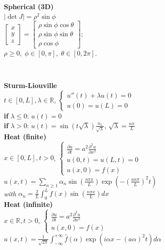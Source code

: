 \documentclass[8pt]{article}
\begin{document}
\begin{minipage}[t]{0.37\textwidth}
	\centering
	\textbf{Spherical (3D)} \\[4pt]
	\(|\det J| = \rho^2\sin\phi\) \\[4pt]
	\(\displaystyle
	\begin{bmatrix}
		x \\[4pt]
		y \\[4pt]
		z
	\end{bmatrix}
	=
	\begin{bmatrix}
		\rho\sin\phi\cos\theta \\[4pt]
		\rho\sin\phi\sin\theta \\[4pt]
		\rho\cos\phi
	\end{bmatrix};
	\) \\[4pt]
	\( \rho \geq 0, \; \phi \in [0, \pi], \; \theta \in [0, 2\pi] \).
\end{minipage}\\[10px]
\begin{minipage}[t]{0.5\textwidth}
	\textbf{Sturm-Liouville}\\
	$t \in [0, L], \lambda \in \mathbb{R}$,
	$\begin{cases}
			u''(t) + \lambda u(t) = 0 \\
			u(0) = u(L) = 0
		\end{cases}$\\
	\textbf{if} $\lambda \leq 0$: $u(t) = 0$\\
	\textbf{if} $\lambda > 0$: $u(t) = \sin(t\sqrt{\lambda}) \frac{u_1}{\sqrt{\lambda}}$, $\sqrt{\lambda} = \frac{n\pi}{L}$\\\vfill
	\textbf{Heat (finite)}\\
	$x \in [0, L], t > 0$,
	$\begin{cases}
			\frac{\partial u}{\partial t} = a^2 \frac{\partial^2 u}{\partial x^2} \\
			u(0, t) = u(L, t) = 0                                                 \\
			u(x, 0) = f(x)
		\end{cases}$\\
	$u(x, t) = \sum_{n \geq 1} \alpha_n \sin\left(\frac{n\pi x}{L}\right) \exp\left(-\left(\frac{an\pi}{L}\right)^2 t\right)$\\
	\textit{with} $\alpha_n = \frac{2}{L} \int_0^L f(x) \sin\left(\frac{n\pi x}{L}\right) dx$\\\vfill
	\textbf{Heat (infinite)}\\
	$x \in \mathbb{R}, t > 0$,
	$\begin{cases}
			\frac{\partial u}{\partial t} = a^2 \frac{\partial^2 u}{\partial x^2} \\
			u(x, 0) = f(x)
		\end{cases}$\\
	$u(x, t) = \frac{1}{\sqrt{2\pi}} \int_{-\infty}^{+\infty} \hat{f}(\alpha) \exp(i\alpha x - (a\alpha)^2 t) d\alpha$
\end{minipage}
\end{document}
